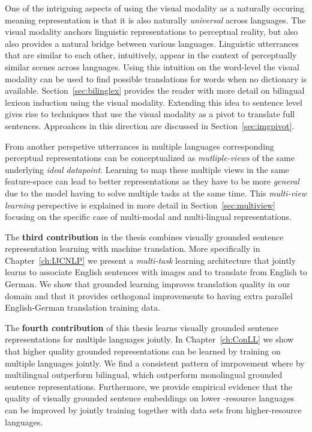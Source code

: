 One of the intriguing aspects of using the visual modality as a naturally occuring meaning representation is that it
is also naturally \emph{universal} across languages. 
The visual modality anchors linguistic representations to perceptual reality, but also
also provides a natural bridge between various languages. Linguistic utterrances that are similar 
to each other, intuitively, appear in the context of perceptually similar scenes across languages. 
Using this intuition on the word-level the visual modality can be used to find possible translations 
for words when no dictionary is available. Section~\ref{sec:bilinglex} provides the reader with more
detail on bilingual lexicon induction using the visual modality. 
Extending this idea to sentence level gives rise to techniques that
use the visual modality as a pivot to translate full sentences. Approahces in this direction are discussed
in Section~\ref{sec:imgpivot}. 

From another perspetive utterrances in multiple languages corresponding perceptual representations 
can be conceptualized as \emph{mutliple-views} of the same underlying \emph{ideal datapoint}.
Learning to map these multiple views in the same feature-space can lead to better representations as
they have to be more \emph{general} due to the model having to solve multiple tasks at the same time. 
This \emph{multi-view learning} perspective is explained in more detail in Section~\ref{sec:multiview} 
focusing on the specific case of multi-modal and multi-lingual representations.

The \textbf{third contribution} in the thesis combines visually grounded sentence representation learning
with machine translation. More specifically in Chapter~\ref{ch:IJCNLP} we present a \emph{multi-task} 
learning architecture that jointly learns to associate English sentences with images and to translate from
English to German. We show that grounded learning improves translation quality in our domain and that 
it provides orthogonal improvements to having extra parallel English-German translation training data.

The \textbf{fourth contribution} of this thesis learns visually grounded sentence representations for 
multiple languages jointly.  In Chapter~\ref{ch:ConLL} we show that higher quality grounded 
representations can be learned by training on multiple languages jointly. We find a consistent pattern
of imrpovement where by multilingual outperform bilingual, which outperform monolingual grounded
sentence representations. Furthermore, we provide empirical evidence that the quality of 
visually grounded sentence embeddings on lower -resource languages can be improved by jointly training
together with data sets from higher-resource languages.

